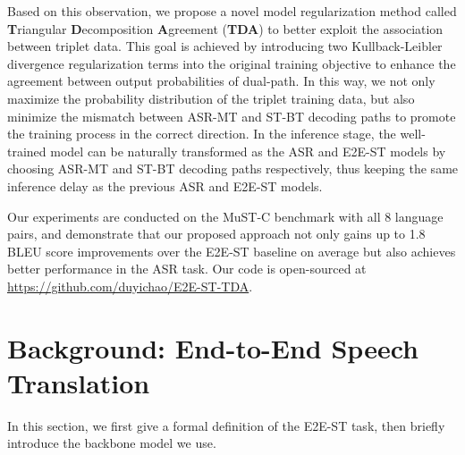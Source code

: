 \documentclass[letterpaper]{article} %
\begin{document}
Based on this observation, we propose a novel model regularization method called \textbf{T}riangular \textbf{D}ecomposition \textbf{A}greement (\textbf{TDA}) to better exploit the association between triplet data.
This goal is achieved by introducing two Kullback-Leibler divergence regularization terms into the original training objective to enhance the agreement between output probabilities of dual-path.
In this way, we not only maximize the probability distribution of the triplet training data, but also minimize the mismatch between ASR-MT and ST-BT decoding paths to promote the training process in the correct direction.
In the inference stage, the well-trained model can be naturally transformed as the ASR and E2E-ST models by choosing ASR-MT and ST-BT decoding paths respectively, thus keeping the same inference delay as the previous ASR and E2E-ST models.

Our experiments are conducted on the MuST-C benchmark with all 8 language pairs, and demonstrate that our proposed approach not only gains up to 1.8 BLEU score improvements over the E2E-ST baseline on average but also achieves better performance in the ASR task. Our code is open-sourced at \url{https://github.com/duyichao/E2E-ST-TDA}.


\section{Background: End-to-End Speech Translation}
In this section, we first give a formal definition of the E2E-ST task, then briefly introduce the backbone model we use.
\end{document}
